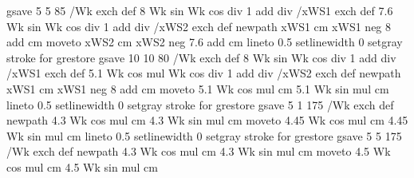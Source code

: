 {{%
  gsave
      5 5 85 { /Wk exch def
                    {8 Wk sin Wk cos div 1 add div} /xWS1 exch def
                    {7.6 Wk sin Wk cos div 1 add div} /xWS2 exch def
                    newpath
                    xWS1 cm xWS1 neg 8 add cm moveto
                    xWS2 cm xWS2 neg 7.6 add cm
                   lineto
                   0.5 setlinewidth
                   0 setgray
                   stroke
                } for
  grestore
  gsave
      10 10 80 { /Wk exch def
                        {8 Wk sin Wk cos div 1 add div} /xWS1 exch def
                        {5.1 Wk cos mul  Wk cos div 1 add div} /xWS2 exch def
                        newpath
                        xWS1 cm xWS1 neg 8 add cm moveto
                        5.1 Wk cos mul cm 5.1 Wk sin mul cm
                        lineto
                        0.5 setlinewidth
                        0 setgray
                        stroke
                   } for
  grestore
  gsave
          5 1 175 { /Wk exch def
                           newpath
                           4.3 Wk cos mul cm 4.3 Wk sin mul cm moveto
                           4.45 Wk cos mul cm 4.45 Wk sin mul cm
                           lineto
                           0.5 setlinewidth
                           0 setgray
                           stroke
                        } for
  grestore
  gsave
         5 5 175 { /Wk exch def
                          newpath
                         4.3 Wk cos mul cm 4.3 Wk sin mul cm moveto
                         4.5 Wk cos mul cm 4.5 Wk sin mul cm
}}}
